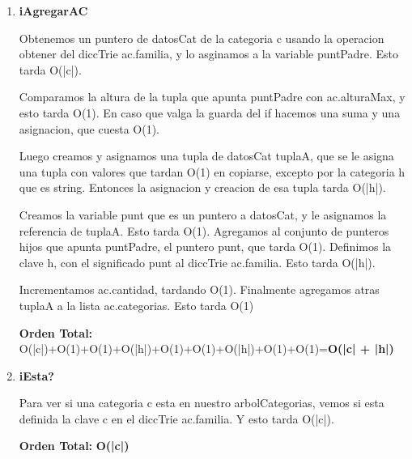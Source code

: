 \begin{enumerate}
\item\textbf{iAgregarAC}
\par Obtenemos un puntero de datosCat de la categoria c usando la operacion obtener del diccTrie ac.familia, y lo asginamos a la variable puntPadre. Esto tarda O(|c|).
\par Comparamos la altura de la tupla que apunta puntPadre con ac.alturaMax, y esto tarda O(1). En caso que valga la guarda del if hacemos una suma y una asignacion, que cuesta O(1).
\par Luego creamos y asignamos una tupla de datosCat tuplaA, que se le asigna una tupla con valores que tardan O(1) en copiarse, excepto por la categoria h que es string. Entonces la asignacion y creacion de esa tupla tarda O(|h|).
\par Creamos la variable punt que es un puntero a datosCat, y le asignamos la referencia de tuplaA. Esto tarda O(1). Agregamos al conjunto de punteros hijos que apunta puntPadre, el puntero punt, que tarda O(1). Definimos la clave h, con el significado punt al diccTrie ac.familia. Esto tarda O(|h|).
\par Incrementamos ac.cantidad, tardando O(1). Finalmente agregamos atras tuplaA a la lista ac.categorias. Esto tarda O(1)
\par \textbf{Orden Total:} O(|c|)+O(1)+O(1)+O(|h|)+O(1)+O(1)+O(|h|)+O(1)+O(1)=\textbf{O(|c| + |h|)}

\item\textbf{iEsta?}
\par Para ver si una categoria c esta en nuestro arbolCategorias, vemos si esta definida la clave c en el diccTrie ac.familia. Y esto tarda O(|c|).
\par \textbf{Orden Total:} \textbf{O(|c|)}


\end{enumerate}
